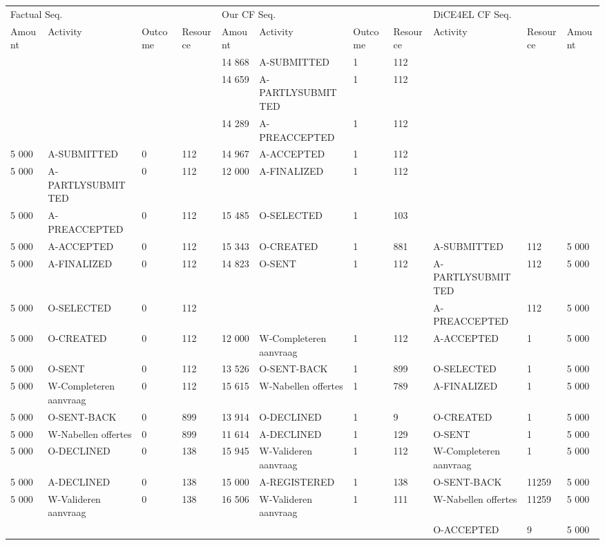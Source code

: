 \begin{tabular}{lllllllllll}
\toprule
\multicolumn{4}{l}{Factual Seq.} & \multicolumn{4}{l}{Our CF Seq.} & \multicolumn{3}{l}{DiCE4EL CF Seq.} \\
Amount & Activity & Outcome & Resource & Amount & Activity & Outcome & Resource & Activity & Resource & Amount \\
\midrule
 &  &  &  & 14 868 & A-SUBMITTED & 1 & 112 &  &  &  \\
 &  &  &  & 14 659 & A-PARTLYSUBMITTED & 1 & 112 &  &  &  \\
 &  &  &  & 14 289 & A-PREACCEPTED & 1 & 112 &  &  &  \\
5 000 & A-SUBMITTED & 0 & 112 & 14 967 & A-ACCEPTED & 1 & 112 &  &  &  \\
5 000 & A-PARTLYSUBMITTED & 0 & 112 & 12 000 & A-FINALIZED & 1 & 112 &  &  &  \\
5 000 & A-PREACCEPTED & 0 & 112 & 15 485 & O-SELECTED & 1 & 103 &  &  &  \\
5 000 & A-ACCEPTED & 0 & 112 & 15 343 & O-CREATED & 1 & 881 & A-SUBMITTED & 112 & 5 000 \\
5 000 & A-FINALIZED & 0 & 112 & 14 823 & O-SENT & 1 & 112 & A-PARTLYSUBMITTED & 112 & 5 000 \\
5 000 & O-SELECTED & 0 & 112 &  &  &  &  & A-PREACCEPTED & 112 & 5 000 \\
5 000 & O-CREATED & 0 & 112 & 12 000 & W-Completeren aanvraag & 1 & 112 & A-ACCEPTED & 1 & 5 000 \\
5 000 & O-SENT & 0 & 112 & 13 526 & O-SENT-BACK & 1 & 899 & O-SELECTED & 1 & 5 000 \\
5 000 & W-Completeren aanvraag & 0 & 112 & 15 615 & W-Nabellen offertes & 1 & 789 & A-FINALIZED & 1 & 5 000 \\
5 000 & O-SENT-BACK & 0 & 899 & 13 914 & O-DECLINED & 1 & 9 & O-CREATED & 1 & 5 000 \\
5 000 & W-Nabellen offertes & 0 & 899 & 11 614 & A-DECLINED & 1 & 129 & O-SENT & 1 & 5 000 \\
5 000 & O-DECLINED & 0 & 138 & 15 945 & W-Valideren aanvraag & 1 & 112 & W-Completeren aanvraag & 1 & 5 000 \\
5 000 & A-DECLINED & 0 & 138 & 15 000 & A-REGISTERED & 1 & 138 & O-SENT-BACK & 11259 & 5 000 \\
5 000 & W-Valideren aanvraag & 0 & 138 & 16 506 & W-Valideren aanvraag & 1 & 111 & W-Nabellen offertes & 11259 & 5 000 \\
 &  &  &  &  &  &  &  & O-ACCEPTED & 9 & 5 000 \\
\bottomrule
\end{tabular}

